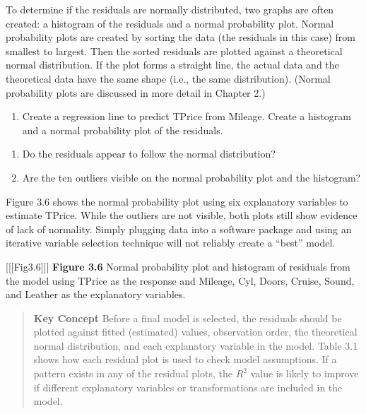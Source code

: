 \documentclass[
]{report}
\providecommand{\tightlist}{%
  \setlength{\itemsep}{0pt}\setlength{\parskip}{0pt}}
\begin{document}
To determine if the residuals are normally distributed, two graphs are often created: a histogram of the residuals and a normal probability plot. Normal probability plots are created by sorting the data (the residuals in this case) from smallest to largest. Then the sorted residuals are plotted against a theoretical normal distribution. If the plot forms a straight line, the actual data and the theoretical data have the same shape (i.e., the same distribution). (Normal probability plots are discussed in more detail in
Chapter 2.)

\begin{enumerate}
\def\labelenumi{\arabic{enumi}.}
\setcounter{enumi}{12}
\tightlist
\item
  Create a regression line to predict TPrice from Mileage. Create a histogram and a normal probability plot of the residuals.
\end{enumerate}

\begin{enumerate}
\def\labelenumi{\alph{enumi}.}
\item
  Do the residuals appear to follow the normal distribution?
\item
  Are the ten outliers visible on the normal probability plot and the histogram?
\end{enumerate}

Figure 3.6 shows the normal probability plot using six explanatory variables to estimate TPrice. While the outliers are not visible, both plots still show evidence of lack of normality. Simply plugging data into a software package and using an iterative variable selection technique will not reliably create a ``best'' model.

{[}{[}{[}Fig3.6{]}{]}{]}
\textbf{Figure 3.6} Normal probability plot and histogram of residuals from the model using TPrice as the response and Mileage, Cyl, Doors, Cruise, Sound, and Leather as the explanatory variables.

\begin{quote}
\textbf{Key Concept}
Before a final model is selected, the residuals should be plotted against fitted (estimated) values, observation order, the theoretical normal distribution, and each explanatory variable in the model. Table 3.1 shows how each residual plot is used to check model assumptions. If a pattern exists in any of the residual plots, the \(R^2\) value is likely to improve if different explanatory variables or transformations are included in the model.
\end{quote}
\end{document}
